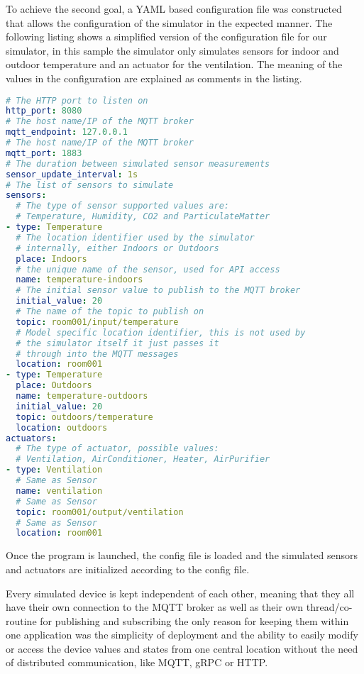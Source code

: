To achieve the second goal, a YAML based configuration file was
constructed that allows the configuration of the simulator in the
expected manner. The following listing shows a simplified version of the
configuration file for our simulator, in this sample the simulator only
simulates sensors for indoor and outdoor temperature and an actuator for
the ventilation. The meaning of the values in the configuration are
explained as comments in the listing.

\begin{lstlisting}[language=yaml]
# The HTTP port to listen on
http_port: 8080
# The host name/IP of the MQTT broker
mqtt_endpoint: 127.0.0.1
# The host name/IP of the MQTT broker
mqtt_port: 1883
# The duration between simulated sensor measurements
sensor_update_interval: 1s
# The list of sensors to simulate
sensors:
  # The type of sensor supported values are:
  # Temperature, Humidity, CO2 and ParticulateMatter
- type: Temperature
  # The location identifier used by the simulator
  # internally, either Indoors or Outdoors
  place: Indoors
  # the unique name of the sensor, used for API access
  name: temperature-indoors
  # The initial sensor value to publish to the MQTT broker
  initial_value: 20
  # The name of the topic to publish on
  topic: room001/input/temperature
  # Model specific location identifier, this is not used by
  # the simulator itself it just passes it
  # through into the MQTT messages
  location: room001
- type: Temperature
  place: Outdoors
  name: temperature-outdoors
  initial_value: 20
  topic: outdoors/temperature
  location: outdoors
actuators:
  # The type of actuator, possible values:
  # Ventilation, AirConditioner, Heater, AirPurifier
- type: Ventilation
  # Same as Sensor
  name: ventilation
  # Same as Sensor
  topic: room001/output/ventilation
  # Same as Sensor
  location: room001
\end{lstlisting}

Once the program is launched, the config file is loaded and the
simulated sensors and actuators are initialized according to the config
file.

Every simulated device is kept independent of each other, meaning that
they all have their own connection to the MQTT broker as well as their
own thread/co-routine for publishing and subscribing the only reason for
keeping them within one application was the simplicity of deployment and
the ability to easily modify or access the device values and states from
one central location without the need of distributed communication, like
MQTT, gRPC or HTTP.

